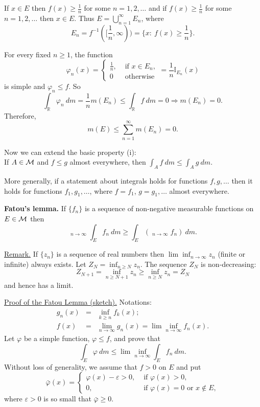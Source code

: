 \documentclass[a4paper,10pt]{article}
\def\RR{\mathbb{R}}
\def\II{\mathbb{I}}
\def\liminf{\mathop{\underline{\lim}}}
\newcommand{\1}[1]{\mathbf{1}_{\{#1\}}}
\begin{document}
If $x\in E$ then $f(x)\ge \frac{1}{n}$ for some $n=1,2,\ldots$ and if $f(x)\ge \frac{1}{n}$ for some $n=1,2,\ldots$ then $x\in E$. Thus $E=\bigcup_{n=1}^\infty E_n$, where
  $$E_n=f^{-1}([\frac{1}{n},\infty))=\{x:~f(x)\ge\frac{1}{n}\}.$$

For every fixed $n\ge 1$, the function
  $$\varphi_n(x)=\left\{\begin{array}{ll} \frac{1}{n}, & \mbox{ if } x\in E_n, \\ 0 & \mbox{ otherwise} \end{array}\right. =\frac{1}{n} \II_{E_n}(x)$$
is simple and $\varphi_n\le f$. So
  $$\int_\RR\varphi_n~dm=\frac{1}{n} m(E_n)\le \int_\RR f~dm=0\Longrightarrow m(E_n)=0.$$
Therefore,
  $$m(E)\le \sum_{n=1}^\infty m(E_n)=0.$$
\blacksquare \vspace{3mm}

Now we can extend the basic property (i): \\
If $A\in{\cal M}$ and $f\le g$ almost everywhere, then $\int_A f~dm\le \int_A g~dm$.

More generally, if a statement about integrals holds for functions $f,g,\ldots$ then it holds for functions $f_1,g_1,\ldots$, where $f=f_1$, $g=g_1, \ldots$ almost everywhere.\vspace{3mm}

{\bf Fatou's lemma.}
If $\{f_n\}$ is a sequence of non-negative measurable functions on $E\in{\cal M}$ then
  $$\liminf_{n\to\infty} \int_E f_n~dm\ge \int_E\left(\liminf_{n\to\infty} f_n\right)~ dm.$$
\vspace{3mm}

\underline{Remark.} If $\{z_n\}$ is a sequence of real numbers then $\lim \inf_{n\to\infty} z_n$ (finite or infinite) always exists. Let $Z_N=\inf_{n\ge N} z_n$. The sequence $Z_N$ is non-decreasing:
  $$Z_{N+1}=\inf_{n\ge N+1} z_n\ge \inf_{n\ge N} z_n=Z_N$$
and hence has a limit. \vspace{3cm}

\underline{Proof of the Fatou Lemma (sketch).} Notations:
\begin{eqnarray*}
g_n(x) &=& \inf_{k\ge n} f_k(x); \\
f(x) & = & \lim_{n\to\infty} g_n(x)=\lim \inf_{n\to\infty} f_n(x).
\end{eqnarray*}
Let $\varphi$ be a simple function, $\varphi\le f$, and prove that
  $$\int_E \varphi~dm\le\lim \inf_{n\to\infty} \int_E f_n~dm.$$
Without loss of generality, we assume that $f>0$ on $E$ and put
  $$\bar\varphi(x)=\left\{\begin{array}{rl} \varphi(x)-\varepsilon>0, & \mbox{ if } \varphi(x)>0, \\ 0, & \mbox{ if } \varphi(x)=0 \mbox{ or } x\notin E, \end{array}\right. $$
where $\varepsilon>0$ is so small that $\bar\varphi\ge 0$.
\end{document}
